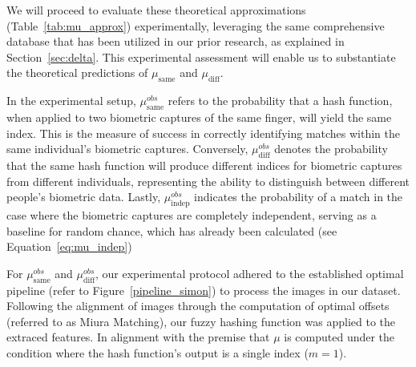 We will proceed to evaluate these theoretical approximations (Table~\ref{tab:mu_approx}) experimentally, leveraging the same comprehensive database that has been utilized in our prior research, as explained in Section~\ref{sec:delta}. This experimental assessment will enable us to substantiate the theoretical predictions of \(\mu_{\text{same}}\) and \(\mu_{\text{diff}}\).

In the experimental setup, \(\mu^{obs}_{\text{same}}\) refers to the probability that a hash function, when applied to two biometric captures of the same finger, will yield the same index. This is the measure of success in correctly identifying matches within the same individual's biometric captures. Conversely, \(\mu^{obs}_{\text{diff}}\) denotes the probability that the same hash function will produce different indices for biometric captures from different individuals, representing the ability to distinguish between different people's biometric data. Lastly, \(\mu^{obs}_{\text{indep}}\) indicates the probability of a match in the case where the biometric captures are completely independent, serving as a baseline for random chance, which has already been calculated (see Equation~\ref{eq:mu_indep})

For \(\mu_{\text{same}}^{obs}\) and \(\mu_{\text{diff}}^{obs}\), our experimental protocol adhered to the established optimal pipeline (refer to Figure~\ref{pipeline_simon}) to process the images in our dataset. Following the alignment of images through the computation of optimal offsets (referred to as Miura Matching), our fuzzy hashing function was applied to the extraced features. In alignment with the premise that \(\mu\) is computed under the condition where the hash function's output is a single index (\(m=1\)).

